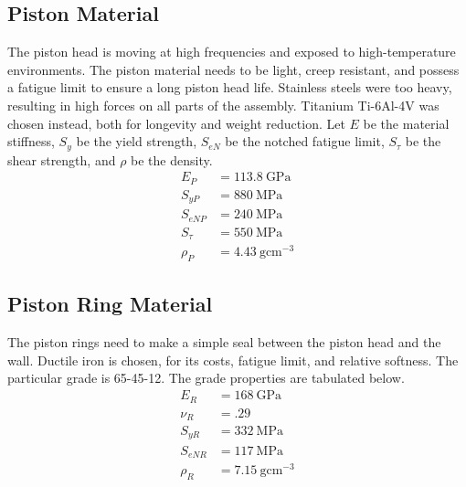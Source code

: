 \documentclass[10pt,a4paper]{article}
\begin{document}
\subsection*{Piston Material}
The piston head is moving at high frequencies and exposed to high-temperature environments. The piston material needs to be light, creep resistant, and possess a fatigue limit to ensure a long piston head life. Stainless steels were too heavy, resulting in high forces on all parts of the assembly. Titanium Ti-6Al-4V was chosen instead, both for longevity and weight reduction. Let $E$ be the material stiffness, $S_y$ be the yield strength, $S_{eN}$ be the notched fatigue limit, $S_{\tau}$ be the shear strength, and $\rho$ be the density. 
\begin{align*}
	E_P &= 113.8\ \text{GPa}\nonumber \\
	S_{y P} &= 880\ \text{MPa}\nonumber \\
	S_{eN P} &= 240\ \text{MPa}\nonumber \\
	S_{\tau} &= 550\ \text{MPa}\nonumber \\
	\rho_P &= 4.43\ \text{g}\text{cm}^{-3}\nonumber 
\end{align*}
\subsection*{Piston Ring Material}
The piston rings need to make a simple seal between the piston head and the wall. Ductile iron is chosen, for its costs, fatigue limit, and relative softness. The particular grade is 65-45-12. The grade properties are tabulated below.
\begin{align*}
	E_R &= 168\ \text{GPa}\nonumber \\
	\nu_R &= .29\nonumber \\
	S_{y R} &= 332\ \text{MPa}\nonumber \\
	S_{eN R}&= 117\ \text{MPa}\nonumber \\ 
	\rho_R &= 7.15\ \text{g}\text{cm}^{-3}\nonumber 
\end{align*}
\end{document}
